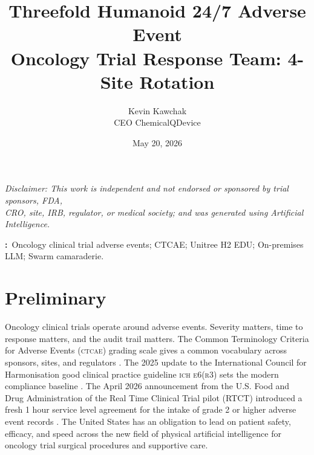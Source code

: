 \documentclass[11pt]{article}
\title{Threefold Humanoid 24/7 Adverse Event\\Oncology Trial Response Team: 4-Site Rotation}
\author{%
  Kevin Kawchak\hspace{2pt}\orcidicon{0009-0007-5457-8667}\\
  CEO ChemicalQDevice\\
  \doiLink{10.5281/zenodo.20303281}
}
\date{May 20, 2026}
\begin{document}
\maketitle

\vspace{-0.3cm}


\begin{abstract}
\vspace{-0.5cm}

\end{abstract}

\vspace{-0.2cm}

\begin{center}
\normalsize\itshape
Disclaimer: This work is independent and not endorsed or sponsored by trial sponsors, FDA,\\CRO, site, IRB, regulator, or medical society; and was generated using Artificial Intelligence.
\end{center}

\vspace{0.1cm}

\noindent\textbf{\keywordsname:}\ Oncology clinical trial adverse events; CTCAE; Unitree H2 EDU; On-premises LLM; Swarm camaraderie.

\vspace{-0.1cm}

\section{Preliminary}
\label{sec:introduction}
Oncology clinical trials operate around adverse events. Severity
matters, time to response matters, and the audit trail matters. The Common Terminology Criteria for Adverse Events
(\textsc{ctcae}) grading scale gives a common vocabulary across
sponsors, sites, and regulators \cite{ctcae_v5_2017}. The 2025 update
to the International Council for Harmonisation good clinical practice
guideline \textsc{ich e6(r3)} sets the modern compliance baseline
\cite{ich_e6r3_2025}. The April 2026 announcement from the U.S. Food
and Drug Administration of the Real Time Clinical Trial pilot (RTCT)
introduced a fresh 1 hour service level agreement for the intake of
grade 2 or higher adverse event records \cite{fda_rtct_2026,
fda2026realtime}. The United States has an obligation to lead on
patient safety, efficacy, and speed across the new field of
physical artificial intelligence for oncology trial
surgical procedures and supportive care.
\end{document}
